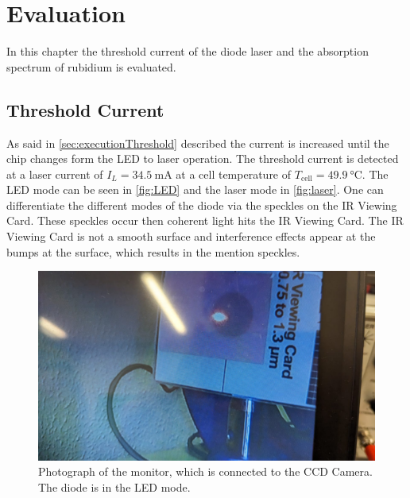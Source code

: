 \section{Evaluation}
\label{sec:auswertung}

In this chapter the threshold current of the diode laser and the absorption spectrum of rubidium is evaluated. 

\subsection{Threshold Current}

As said in \autoref{sec:executionThreshold} described the current is increased until the chip changes form the LED to laser operation.
The threshold current is detected at a laser current of $I_L = \SI{34.5}{\milli\ampere}$ at a cell temperature of $T_\text{cell} = \SI{49.9}{\celsius}$.
The LED mode can be seen in \autoref{fig:LED} and the laser mode in \autoref{fig:laser}. 
One can differentiate the different modes of the diode via the speckles on the IR Viewing Card.
These speckles occur then coherent light hits the IR Viewing Card. 
The IR Viewing Card is not a smooth surface and interference effects appear at the bumps at the surface, which results in the mention speckles.

\begin{figure}[H]
    \centering
    \includegraphics[width=\textwidth]{data/08.pdf}
    \caption{Photograph of the monitor, which is connected to the CCD Camera. The diode is in the LED mode.}
    \label{fig:LED}
\end{figure}

